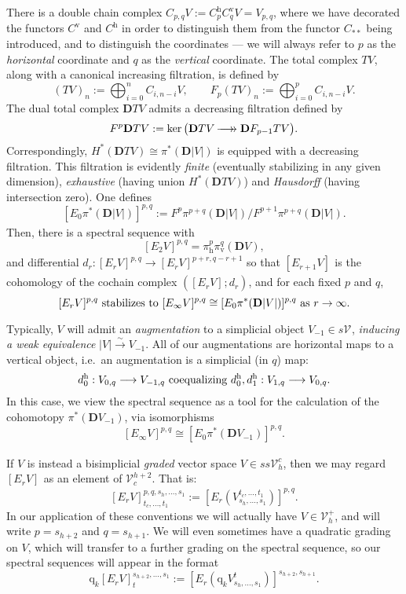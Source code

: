 \documentclass[11pt]{amsart} \renewcommand{\baselinestretch}{1.2}
\theoremstyle{plain}
\theoremstyle{definition}
\renewcommand{\ker}{\mathrm{ker}\,}
\renewcommand{\to}{\longrightarrow}
\newcommand{\calV}{\mathcal{V}}
\newcommand{\vect}[2]{\calV^{#1}_{#2}}
\newcommand{\quadgrad}[1]{\mathrm{q}_{#1}}
\newcommand{\epi}{{\,\makebox[0cm][l]{\ensuremath\to}\to{}}}
\newcommand{\Edown}[4]{[E_{#1}#2]^{#3}_{#4}}
\newcommand{\uver}{^\mathrm{v}}
\newcommand{\uhor}{^\mathrm{h}}
\newcommand{\dver}{_\mathrm{v}}
\newcommand{\dhor}{_\mathrm{h}}
\newcommand{\diag}[1]{|#1|}
\newcommand{\dual}{\mathbf{D}}
\begin{document}
\begin{Conventions and notation}
There is a double chain complex $C_{p,q}V:=C\uhor_p C\uver_q V=V_{p,q}$, where we have decorated the  functors $C\uver$ and $C\uhor$ in order to distinguish them from the functor $C_{**}$ being introduced, and to distinguish the coordinates --- we will always refer to $p$ as the \emph{horizontal} coordinate and $q$ as the \emph{vertical} coordinate. The total complex $TV$, along with a canonical increasing filtration, is defined by 
\[(TV)_n:=\bigoplus_{i=0}^{n}C_{i,n-i}V,\qquad F_p(TV)_n:=\bigoplus_{i=0}^{p}C_{i,n-i}V.\]
The dual total complex $\dual TV$ admits a decreasing filtration defined by
\[F^p\dual TV:=\ker\bigl(\dual TV\epi \dual F_{p-1} TV\bigr).\]
Correspondingly, $H^*(\dual TV)\cong \pi^*(\dual\diag{ V})$ is equipped with a decreasing filtration. This filtration is evidently \emph{finite} (eventually stabilizing in any given dimension), \emph{exhaustive} (having union $H^*(\dual TV)$) and \emph{Hausdorff} (having intersection zero). One defines
\[\Edown{0}{\pi^*(\dual\diag{ V})}{p,q}{}:=F^{p}\pi^{p+q}(\dual\diag{ V})/F^{p+1}\pi^{p+q}(\dual\diag{ V}).\]
Then, there is a spectral sequence with
\[\Edown{2}{V}{p,q}{}=\pi\dhor^{p}\pi\dver^{q}(\dual V),\]
and differential $d_r:\Edown{r}{V}{p,q}{}\to \Edown{r}{V}{p+r,q-r+1}{}$ so that $\Edown{r+1}{V}{}{}$ is the cohomology of the cochain complex $(\Edown{r}{V}{}{};d_r)$, and for each fixed $p$ and $q$,
\[\Edown{r}{V}{p,q}{}\textup{ stabilizes to }\Edown{\infty}{V}{p,q}{}\cong \Edown{0}{\pi^*(\dual\diag{ V})}{p,q}{}\textup{ as $r\rightarrow\infty$}.\]

Typically, $V$ will admit an \emph{augmentation} to a simplicial object $V_{-1}\in s\vect{}{}$, \emph{inducing a weak equivalence} $\diag{ V}\overset{\sim}{\to}V_{-1}$. All of our  augmentations are horizontal maps to a vertical object, i.e.\ an augmentation is a simplicial (in $q$) map:
\[d\uhor_0:V_{0,q}\to V_{-1,q}\textup{ coequalizing }d\uhor_0,d\uhor_1:V_{1,q}\to V_{0,q}.\]
In this case, we view the spectral sequence as a tool for the calculation of the cohomotopy $\pi^*(\dual V_{-1})$, via isomorphisms
\[\Edown{\infty}{V}{p,q}{}\cong \Edown{0}{\pi^*(\dual V_{-1})}{p,q}{}.\]


If $V$ is instead a bisimplicial \emph{graded} vector space $V\in ss\vect{c}{h}$, then we may regard $\Edown{r}{V}{}{}$ as an element of $\vect{h+2}{c}$. That is:
\[\Edown{r}{V}{p,q,s_h,\ldots,s_1}{t_c,\ldots,t_1}:=\Edown{r}{(V^{t_c,\ldots,t_1}_{s_h,\ldots,s_1})}{p,q}{}.\]
In our application of these conventions we will actually have $V\in \vect{+}{h}$, and will write $p=s_{h+2}$ and $q=s_{h+1}$. We will even sometimes have a quadratic grading on $V$, which will transfer to a further grading on the spectral sequence, so our spectral sequences will appear in the format
\[\quadgrad{k}\Edown{r}{V}{s_{h+2},\ldots,s_1}{t}:=\Edown{r}{(\quadgrad{k}V^{t}_{s_h,\ldots,s_1})}{s_{h+2},s_{h+1}}{}.\]



\end{Conventions and notation}
\end{document}

